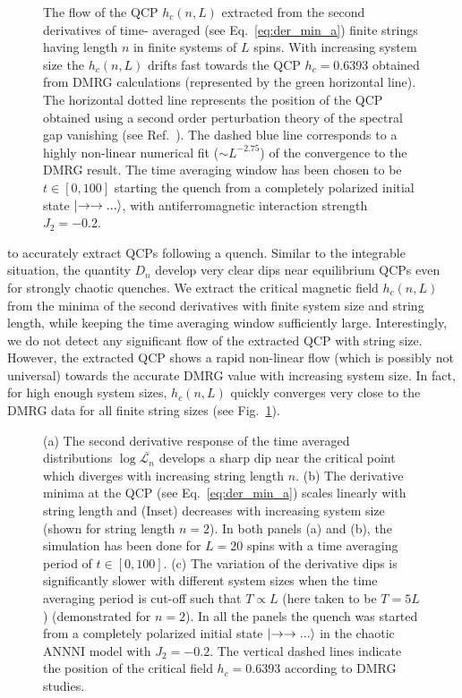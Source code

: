 \documentclass[aps,prx,twocolumn]{revtex4-2}
\begin{document}
{{\begin{figure}
	\caption{ {The flow of the QCP $h_c(n,L)$ extracted from the second derivatives of time- averaged (see Eq.~\eqref{eq:der_min_a}) finite strings having length $n$ in finite systems of $L$ spins. With increasing system size the $h_c(n,L)$ drifts fast towards the QCP $h_c=0.6393$ obtained from DMRG calculations (represented by the green horizontal line). The horizontal dotted line represents the position of the QCP obtained using a second order perturbation theory of the spectral gap vanishing (see Ref.~\cite{matteo06}). The dashed blue line corresponds to a highly non-linear numerical fit ($\sim L^{-2.75}$) of the convergence to the DMRG result. The time averaging window has been chosen to be $t\in[0,100]$ starting the quench from a completely polarized initial state $\ket{\rightarrow\rightarrow...}$, with antiferromagnetic interaction strength $J_2=-0.2$.}}
	\label{fig:drift} 
\end{figure}
 {to accurately extract QCPs following a quench. Similar to the integrable situation, the quantity $D_n$ develop very clear dips near equilibrium QCPs even for strongly chaotic quenches. We extract the critical magnetic field $h_c(n,L)$ from the minima of the second derivatives with finite system size and string length, while keeping the time averaging window sufficiently large. Interestingly, we do not detect any significant flow of the extracted QCP with string size. However, the extracted QCP shows a rapid non-linear flow (which is possibly not universal) towards the accurate DMRG value with increasing system size. In fact, for high enough system sizes, $h_c(n,L)$ quickly converges very close to the DMRG data for all finite string sizes (see Fig.~\ref{fig:drift}).}\\ 
\begin{figure*}[ht]
	\caption{ {(a) The second derivative response of the time averaged distributions $\log\bar{\mathcal{L}_n}$ develops a sharp dip near the critical point which diverges with increasing string length $n$. (b) The derivative minima at the QCP (see Eq.~\eqref{eq:der_min_a}) scales linearly with string length and (Inset) decreases with increasing system size (shown for string length $n=2$). In both panels (a) and (b), the simulation has been done for $L=20$ spins with a time averaging period of $t\in[0,100]$. (c) The variation of the derivative dips is significantly slower with different system sizes when the time averaging period is cut-off such that $T\propto L$ (here taken to be $T=5L$) (demonstrated for $n=2$). In all the panels the quench was started from a completely polarized initial state $\ket{\rightarrow\rightarrow...}$ in the chaotic ANNNI model with $J_2=-0.2$. The vertical dashed lines indicate the position of the critical field $h_c=0.6393$ according to DMRG studies.}}
	\label{fig:scaling}
\end{figure*}

}}
\end{document}

